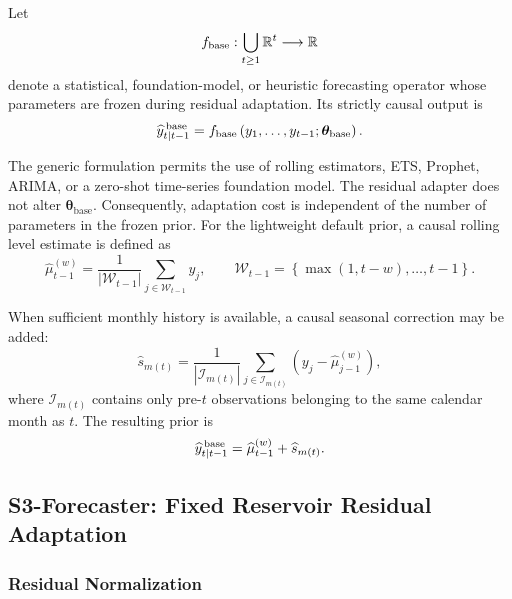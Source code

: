 \documentclass[review,number,sort&compress]{elsarticle}
\begin{document}
Let
\begin{equation}
    f_{\mathrm{base}}:
    \bigcup_{t\geq1}\mathbb{R}^t
    \longrightarrow
    \mathbb{R}
\end{equation}
denote a statistical, foundation-model, or heuristic forecasting operator whose
parameters are frozen during residual adaptation. Its strictly causal output is
\begin{equation}
    \widehat{y}^{\,\mathrm{base}}_{t|t-1}
    =
    f_{\mathrm{base}}
    \left(
    y_1,\ldots,y_{t-1};
    \bm{\theta}_{\mathrm{base}}
    \right).
    \label{eq:causal_base}
\end{equation}

The generic formulation permits the use of rolling estimators, ETS, Prophet,
ARIMA, or a zero-shot time-series foundation model. The residual adapter does
not alter $\bm{\theta}_{\mathrm{base}}$. Consequently, adaptation cost is
independent of the number of parameters in the frozen prior.
For the lightweight default prior, a causal rolling level estimate is defined
as
\begin{equation}
    \widehat{\mu}_{t-1}^{(w)}
    =
    \frac{1}{|\mathcal{W}_{t-1}|}
    \sum_{j\in\mathcal{W}_{t-1}}y_j,
    \qquad
    \mathcal{W}_{t-1}
    =
    \left\{
    \max(1,t-w),\ldots,t-1
    \right\}.
\end{equation}

When sufficient monthly history is available, a causal seasonal correction may
be added:
\begin{equation}
    \widehat{s}_{m(t)}
    =
    \frac{1}{|\mathcal{I}_{m(t)}|}
    \sum_{j\in\mathcal{I}_{m(t)}}
    \left(y_j-\widehat{\mu}_{j-1}^{(w)}\right),
\end{equation}
where $\mathcal{I}_{m(t)}$ contains only pre-$t$ observations belonging to the
same calendar month as $t$. The resulting prior is
\begin{equation}
    \widehat{y}^{\,\mathrm{base}}_{t|t-1}
    =
    \widehat{\mu}_{t-1}^{(w)}
    +
    \widehat{s}_{m(t)}.
\end{equation}

\subsection{S3-Forecaster: Fixed Reservoir Residual Adaptation}
\label{subsec:s3_forecaster}

\subsubsection{Residual Normalization}
\end{document}
